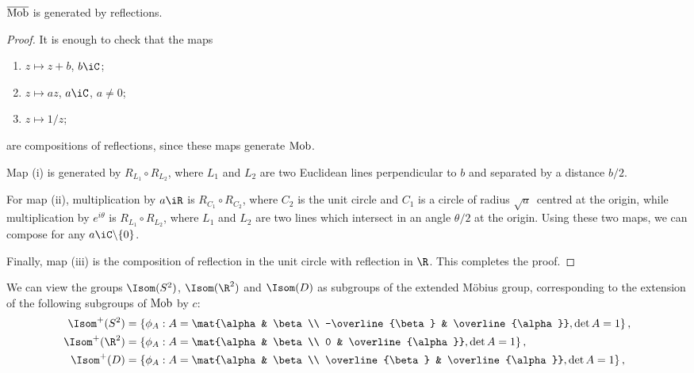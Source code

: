 \begin{proposition}
	$\overline{\operatorname{Mob}}$ is generated by reflections.
\end{proposition}

\begin{proof}
	It is enough to check that the maps
	\begin{enumerate}
		\shortskip
		\item $z\mapsto z+b$, $b\iC$;
		\item $z\mapsto az$, $a\iC$, $a\neq 0$;
		\item $z\mapsto 1/z$;
	\end{enumerate}
	are compositions of reflections, since these maps generate $\operatorname{Mob}$.
	
	Map (i) is generated by $R_{L_1} \circ R_{L_2}$, where $L_1$ and $L_2$ are two Euclidean lines perpendicular to $b$ and separated by a distance $b/2$.

	For map (ii), multiplication by $a\iR$ is $R_{C_1} \circ R_{C_2}$, where $C_2$ is the unit circle and $C_1$ is a circle of radius $\sqrt{a}\,$ centred at the origin, while multiplication by $e^{i\theta}$ is $R_{L_1} \circ R_{L_2}$, where $L_1$ and $L_2$ are two lines which intersect in an angle $\theta/2$ at the origin. Using these two maps, we can compose for any $a\iC\backslash\{0\}$.

	Finally, map (iii) is the composition of reflection in the unit circle with reflection in $\R$. This completes the proof.
\end{proof}

We can view the groups $\Isom(S^2)$, $\Isom(\R^2)$ and $\Isom(D)$ as subgroups of the extended Möbius group, corresponding to the extension of the following subgroups of $\operatorname{Mob}$ by $c$:
\begin{align*}
	\Isom^+(S^2) &= \left\{\phi_A : A = \mat{\alpha & \beta \\ -\overline{\beta} & \overline{\alpha}}, \det A = 1 \right\}, \\
	\Isom^+(\R^2) &= \left\{\phi_A : A = \mat{\alpha & \beta \\ 0 & \overline{\alpha}}, \det A = 1 \right\}, \\
	\Isom^+(D) &= \left\{\phi_A : A = \mat{\alpha & \beta \\ \overline{\beta} & \overline{\alpha}}, \det A = 1 \right\}, \\
\end{align*}


